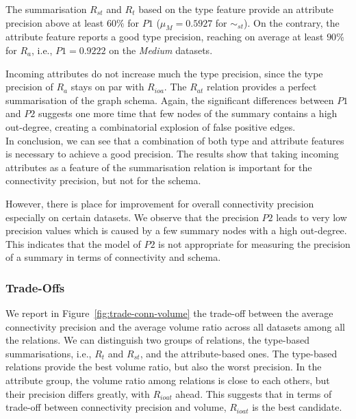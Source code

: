 The summarisation $R_{st}$ and $R_t$ based on the type feature provide an attribute precision above at least $60\%$ for $P1$ ($\mu_M=0.5927$ for $\sim_{st}$).
On the contrary, the attribute feature reports a good type precision, reaching on average at least $90\%$ for $R_a$, i.e., $P1=0.9222$ on the \emph{Medium} datasets.

Incoming attributes do not increase much the type precision, since the type precision of $R_a$ stays on par with $R_{ioa}$. The $R_{at}$ relation provides a perfect summarisation of the graph schema. Again, the significant differences between $P1$ and $P2$ suggests one more time that few nodes of the summary contains a high out-degree, creating a combinatorial explosion of false positive edges.\\



In conclusion, we can see that a combination of both type and attribute features is necessary to achieve a good precision. The results show that taking incoming attributes as a feature of the summarisation relation is important for the connectivity precision, but not for the schema.

However, there is place for improvement for overall connectivity precision especially on certain datasets. We observe that the precision $P2$ leads to very low precision values which is caused by a few summary nodes with a high out-degree. This indicates that the model of $P2$ is not appropriate for measuring the precision of a summary in terms of connectivity and schema.

\subsubsection{Trade-Offs}

We report in Figure~\ref{fig:trade-conn-volume} the trade-off between the average connectivity precision and the average volume ratio across all datasets among all the relations. We can distinguish two groups of relations, the type-based summarisations, i.e., $R_t$ and $R_{st}$, and the attribute-based ones.
The type-based relations provide the best volume ratio, but also the worst precision. In the attribute group, the volume ratio among relations is close to each others, but their precision differs greatly, with $R_{ioat}$ ahead. This suggests that in terms of trade-off between connectivity precision and volume, $R_{ioat}$ is the best candidate.


